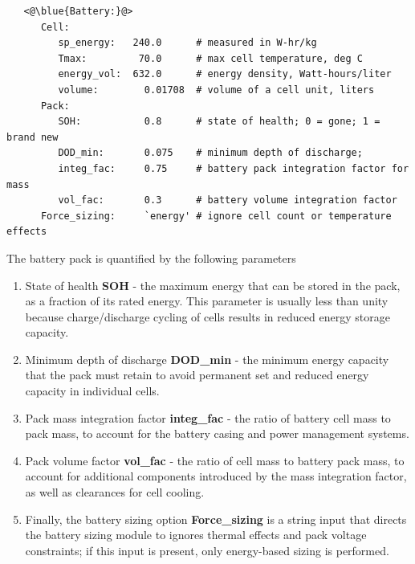 \begin{lstlisting}
   <@\blue{Battery:}@>
      Cell:
         sp_energy:   240.0      # measured in W-hr/kg
         Tmax:         70.0      # max cell temperature, deg C
         energy_vol:  632.0      # energy density, Watt-hours/liter
         volume:        0.01708  # volume of a cell unit, liters
      Pack:
         SOH:           0.8      # state of health; 0 = gone; 1 = brand new
         DOD_min:       0.075    # minimum depth of discharge;
         integ_fac:     0.75     # battery pack integration factor for mass 
         vol_fac:       0.3      # battery volume integration factor 
      Force_sizing:     `energy' # ignore cell count or temperature effects      
\end{lstlisting}
The battery pack is quantified by the following parameters
\begin{enumerate}
\item State of health \textbf{SOH} - the maximum energy that can be stored in the pack, as a fraction of its rated energy. This parameter is usually less than unity because charge/discharge cycling of cells results in reduced energy storage capacity.
\item Minimum depth of discharge \textbf{DOD\_min} - the minimum energy capacity that the pack must retain to avoid permanent set and reduced energy capacity in individual cells. 
\item Pack mass integration factor \textbf{integ\_fac} - the ratio of battery cell mass to pack mass, to account for the battery casing and power management systems.
\item Pack volume factor \textbf{vol\_fac} - the ratio of cell mass to battery pack mass, to account for additional components introduced by the mass integration factor, as well as clearances for cell cooling.
\item Finally, the battery sizing option \textbf{Force\_sizing} is a string input that directs the battery sizing module to ignores thermal effects and pack voltage constraints; if this input is present, only energy-based sizing is performed.
\end{enumerate}

